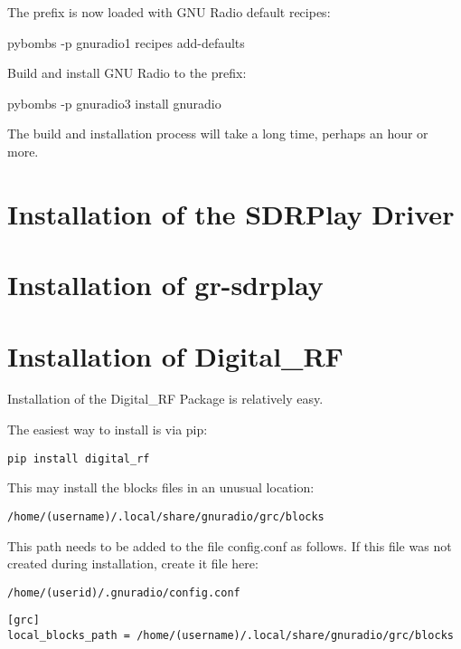 \documentclass[oneside,letterpaper,12pt]{book}
\begin{document}
The prefix is now loaded with GNU Radio default recipes:

pybombs -p gnuradio1 recipes add-defaults

Build and install GNU Radio to the prefix:

pybombs -p gnuradio3 install gnuradio

The build and installation process will take a long time, perhaps an hour or more.

\section{Installation of the SDRPlay Driver}

\section{Installation of gr-sdrplay}

\section{Installation of Digital\_RF}

Installation of the Digital\_RF Package is relatively easy.

The easiest way to install is via pip:

\begin{verbatim}
pip install digital_rf
\end{verbatim}

This may install the blocks files in an unusual location:

\begin{verbatim}
/home/(username)/.local/share/gnuradio/grc/blocks
\end{verbatim}

This path needs to be added to the file config.conf as follows.
If this file was not created during installation, create it file here:

\begin{verbatim}
/home/(userid)/.gnuradio/config.conf
\end{verbatim}

\begin{verbatim}
[grc]
local_blocks_path = /home/(username)/.local/share/gnuradio/grc/blocks
\end{verbatim}

\backmatter
\end{document}
